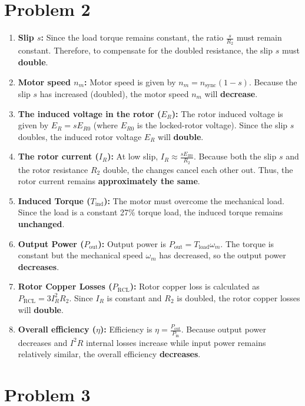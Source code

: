 \documentclass[12pt]{article}
\begin{document}
\newpage

\section*{Problem 2}

\begin{enumerate}[label=(\alph*)]
	\item \textbf{Slip $s$:} Since the load torque remains constant, the ratio $\frac{s}{R_2}$ must remain constant. Therefore, to compensate for the doubled resistance, the slip $s$ must \textbf{double}.
	\item \textbf{Motor speed $n_m$:} Motor speed is given by $n_m = n_{\text{sync}}(1 - s)$. Because the slip $s$ has increased (doubled), the motor speed $n_m$ will \textbf{decrease}.
	\item \textbf{The induced voltage in the rotor ($E_R$):} The rotor induced voltage is given by $E_R = sE_{R0}$ (where $E_{R0}$ is the locked-rotor voltage). Since the slip $s$ doubles, the induced rotor voltage $E_R$ will \textbf{double}.
	\item \textbf{The rotor current ($I_R$):} At low slip, $I_R \approx \frac{sE_{R0}}{R_2}$. Because both the slip $s$ and the rotor resistance $R_2$ double, the changes cancel each other out. Thus, the rotor current remains \textbf{approximately the same}.
	\item \textbf{Induced Torque ($T_{\text{ind}}$):} The motor must overcome the mechanical load. Since the load is a constant 27\% torque load, the induced torque remains \textbf{unchanged}.
	\item \textbf{Output Power ($P_{\text{out}}$):} Output power is $P_{\text{out}} = T_{\text{load}} \omega_m$. The torque is constant but the mechanical speed $\omega_m$ has decreased, so the output power \textbf{decreases}.
	\item \textbf{Rotor Copper Losses ($P_{\text{RCL}}$):} Rotor copper loss is calculated as $P_{\text{RCL}} = 3 I_R^2 R_2$. Since $I_R$ is constant and $R_2$ is doubled, the rotor copper losses will \textbf{double}.
	\item \textbf{Overall efficiency ($\eta$):} Efficiency is $\eta = \frac{P_{\text{out}}}{P_{\text{in}}}$. Because output power decreases and $I^2R$ internal losses increase while input power remains relatively similar, the overall efficiency \textbf{decreases}.
\end{enumerate}

\newpage

\section*{Problem 3}
\end{document}
